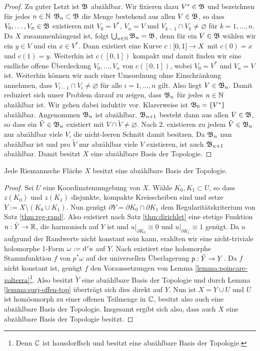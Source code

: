 \begin{proof}
  Zu guter Letzt ist $\mathfrak{B}$ abzählbar. 
  Wir fixieren dazu $V^\ast \in \mathfrak{B}$ und bezeichnen für jedes $n \in \mathbb{N}$
  $\mathfrak{B}_n \subset \mathfrak{B}$ die Menge bestehend aus allen $V \in \mathfrak{B}$, so
  dass $V_0, \dots, V_n \in \mathfrak{B}$ existieren mit $V_0 = V^\ast$, $V_n = V$ und $V_{k-1}
  \cap V_k \neq \varnothing$ für $k = 1, \dots, n$. 
  Da $X$ zusammenhängend ist, folgt $\bigcup_{n \in \mathbb{N}} \mathfrak{B}_n =
  \mathfrak{B}$, denn für ein $V \in \mathfrak{B}$ wählen wir ein $y \in V$ und ein $x
  \in V^\ast$. Dann existiert eine Kurve $c: [0,1] \rightarrow X$ mit $c(0)
  = x$ und $c(1) = y$. Weiterhin ist $c([0,1])$ kompakt und damit
  finden wir eine endliche offene Überdeckung $V_0, \dots, V_n$ von
  $c([0,1])$, wobei $V_0 = V^\ast$ und $V_n = V$ ist. Weiterhin
  können wir nach einer Umsordnung ohne Einschränkung annehmen,
  dass $V_{i-1} \cap V_{i} \neq \varnothing$ für alle $i= 1, \dots,
  n$ gilt. Also liegt $V \in \mathfrak{B}_n$.
  Damit reduziert sich unser Problem darauf zu zeigen, dass $\mathfrak{B}_n$
  für jedes $n \in \mathbb{N}$ abzählbar ist. Wir gehen dabei induktiv vor.
  Klarerweise ist $\mathfrak{B}_0 = \{V^\ast\}$ abzählbar. Angenommen $\mathfrak{B}_n$
  ist abzählbar. $\mathfrak{B}_{n+1}$ besteht dann aus allen $V \in \mathfrak{B}$, so
  dass ein $\tilde V \in \mathfrak{B}_n$ existiert mit $V \cap \tilde V \neq
  \varnothing$. Nach 2. existieren zu jedem $\tilde V \in \mathfrak{B}_n$ nur
  abzählbar viele $V$, die nicht-leeren Schnitt damit besitzen. 
  Da $\mathfrak{B}_n$ nun abzählbar ist und pro $\tilde V$ nur abzählbar
  viele $V$ existieren, ist auch $\mathfrak{B}_{n+1}$ abzählbar.
  Damit besitzt $X$ eine abzählbare Basis der Topologie.
\end{proof}

\begin{thm}[Rad\'o]
  Jede Riemannsche Fläche $X$ besitzt eine abzählbare Basis der
  Topologie.
  \label{thm:rado}
\end{thm}

\begin{proof}
  Sei $U$ eine Koordinatenumgebung von $X$. Wähle $K_0, K_1 \subset
  U$, so dass $z(K_0)$ und $z(K_1)$ disjunkte, kompakte Kreisscheiben
  sind und setze $Y := X \setminus (K_0 \cup K_1)$. 
  Nun genügt $\partial Y = \partial K_0 \cap \partial K_1$ dem
  Regularitätskriterium von Satz \ref{thm:reg-rand}. Also existiert
  nach Satz \ref{thm:dirichlet} eine stetige
  Funktion $u: \bar Y \rightarrow \mathbb{R}$, die harmonisch auf $Y$ ist und
  $u|_{\partial K_0} \equiv 0$ und $u|_{\partial K_1} \equiv 1$
  genügt. Da $u$ aufgrund der Randwerte nicht konstant sein kann, erahlten wir
  eine nicht-triviale holomorphe 1-Form $\omega := \d['u]$ auf $Y$. 
  Nach \cite[Kor. 10.6]{For} existiert eine holomorphe Stammfunktion
  $f$ von $p^\ast\omega$ auf der universellen Überlagerung $p: \tilde
  Y \rightarrow Y$. Da $f$ nicht konstant ist, genügt $f$ den Voraussetzungen von
  Lemma \ref{lemma:poincare-volterra}\footnote{Denn $\mathbb{C}$ ist hausdorffsch
  und besitzt eine abzählbare Basis der Topologie.}. Also besitzt
  $\tilde Y$ eine abzählbare Basis der Topologie und durch
  Lemma \ref{lemma:surj-offen-top} überträgt sich dies direkt auf
  $Y$. Nun ist $X = Y \cup U$ und $U$ ist homöomorph
  zu einer offenen Teilmenge in $\mathbb{C}$, besitzt also auch eine
  abzählbare Basis der Topologie. 
  Insgesamt ergibt sich also, dass auch $X$ eine abzählbare Basis der
  Topologie besitzt.
\end{proof}

